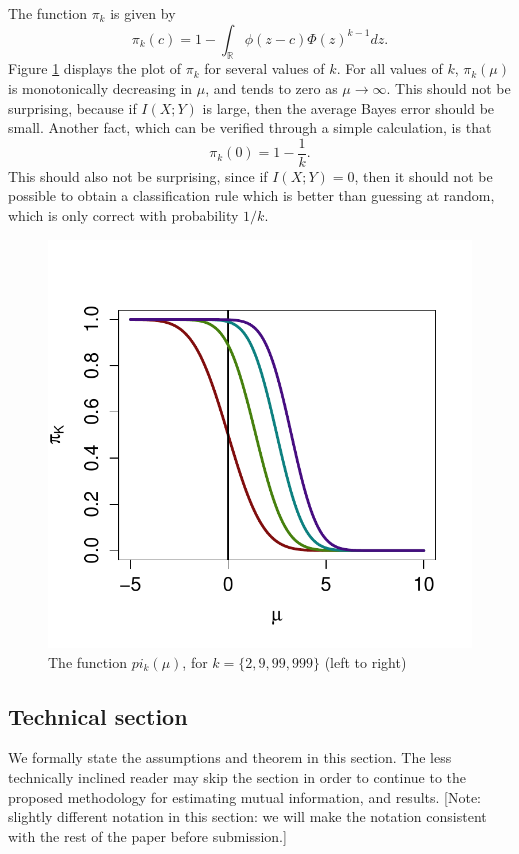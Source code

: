 \documentclass[12pt]{article}
\begin{document}
The function $\pi_k$ is given by
\[
\pi_k(c) = 1 - \int_{\mathbb{R}} \phi(z - c)  \Phi(z)^{k-1} dz.
\]
Figure \ref{fig:pi} displays the plot of $\pi_k$ for several values of $k$.
For all values of $k$, $\pi_k(\mu)$ is monotonically decreasing in $\mu$, and tends to zero as $\mu \to \infty$.
This should not be surprising, because if $I(X; Y)$ is large, then the average Bayes error should be small.
Another fact, which can be verified through a simple calculation, is that 
\[
\pi_k(0) = 1 - \frac{1}{k}.
\]
This should also not be surprising, since if $I(X; Y) = 0$, then it should not be possible to
obtain a classification rule which is better than guessing at random, which is only correct with probability $1/k$.
\begin{figure}
\centering
\includegraphics[scale = 0.5, clip=true, trim=0 0.2in 0 0.5in]{../info_theory_sims/illus_piK.pdf}
\caption{The function $pi_k(\mu)$, for $k = \{2, 9, 99, 999\}$ (left to right) \label{fig:pi}}
\end{figure}


\subsection{Technical section}

We formally state the assumptions and theorem in this section.  The less technically inclined reader may skip the section in order to continue to the proposed methodology for estimating mutual information, and results. [Note: slightly different notation in this section: we will make the notation consistent with the rest of the paper before submission.]
\end{document}
